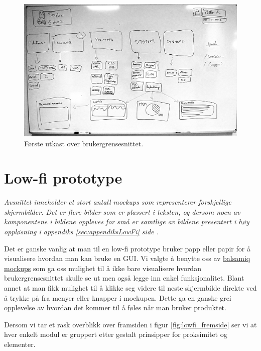 \begin{figure}
\includegraphics[width=\textwidth,height=\textheight,keepaspectratio]{./img/prosessdokumentasjon/foersteutkast/foerste.jpg}
\caption[Første utkast]{Første utkast over brukergrensesnittet.}
\label{fig:foersteutkast}
\end{figure}

\section{Low-fi prototype} \label{sec:lowfi}
\emph{Avsnittet inneholder et stort antall mockups som representerer forskjellige skjermbilder. Det er flere bilder som er plassert i teksten, og dersom noen av komponentene i bildene oppleves for små er samtlige av bildene presentert i høy oppløsning i appendiks \ref{sec:appendiksLowFi} side \pageref{sec:appendiksLowFi}.}

Det er ganske vanlig at man til en low-fi prototype bruker papp eller papir for å visualisere hvordan man kan bruke en GUI. Vi valgte å benytte oss av \href{http://balsamiq.com/products/mockups/}{balsamiq mockups} som ga oss mulighet til å ikke bare visualisere hvordan brukergrensesnittet skulle se ut men også legge inn enkel funksjonalitet. Blant annet at man fikk mulighet til å klikke seg videre til neste skjermbilde direkte ved å trykke på fra menyer eller knapper i mockupen. Dette ga en ganske grei opplevelse av hvordan det kommer til å føles når man bruker produktet.


Dersom vi tar et rask overblikk over framsiden i figur \ref{fig:lowfi_fremside} ser vi at hver enkelt modul er gruppert etter gestalt prinsipper for proksimitet og elementer.\cite{forelesning:tulpesh}

